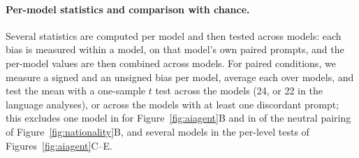 \paragraph{Per-model statistics and comparison with chance.} Several statistics are computed per model and then tested across models: each bias is measured within a model, on that model's own paired prompts, and the per-model values are then combined across models. For paired conditions, we measure a signed and an unsigned bias per model, average each over models, and test the mean with a one-sample $t$ test across the models (24, or 22 in the language analyses), or across the models with at least one discordant prompt; this excludes one model in \he{} for Figure~\ref{fig:aiagent}B and in \de{} of the neutral pairing of Figure~\ref{fig:nationality}B, and several models in the per-level tests of Figures~\ref{fig:aiagent}C--E.
